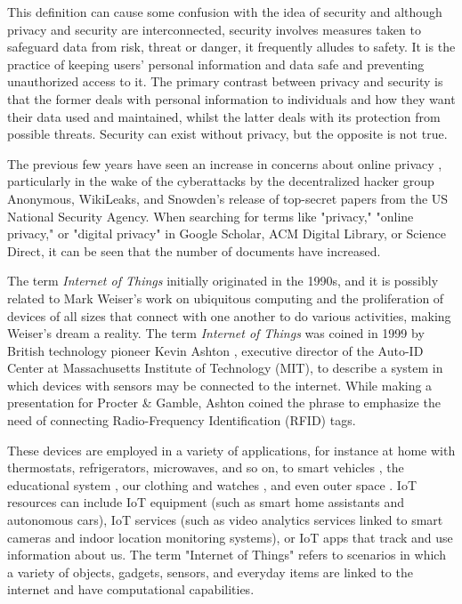 \documentclass[manuscript,natbib=false]{acmart}
\begin{document}
This definition can cause some confusion with the idea of security \cite{HIVDifference}
and although privacy and security are interconnected, security involves
measures taken to safeguard data from risk, threat or danger, it frequently
alludes to safety. It is the practice of keeping users' personal information
and data safe and preventing unauthorized access to it. The primary contrast
between privacy and security is that the former deals with personal information
to individuals and how they want their data used and maintained, whilst
the latter deals with its protection from possible threats. Security can
exist without privacy, but the opposite is not true.

The previous few years have seen an increase in concerns about online privacy \cite{emami2019exploring, park2022personal, zhang2022peer},
particularly in the wake of the cyberattacks by the decentralized hacker
group Anonymous, WikiLeaks, and Snowden's release of top-secret papers
from the US National Security Agency. When searching for terms like "privacy,"
"online privacy," or "digital privacy" in Google Scholar, ACM Digital Library,
or Science Direct, it can be seen that the number of documents have increased.

The term \textit{Internet of Things} initially originated in the 1990s, and it is
possibly related to Mark Weiser's work on ubiquitous computing \cite{weiser1991computer}
and the proliferation
of devices of all sizes that connect with one another to do various activities,
making Weiser's dream a reality. The term \textit{Internet of Things} was coined in
1999 by British technology pioneer Kevin Ashton \cite{KevinThat}, executive director of the
Auto-ID Center at Massachusetts Institute of Technology (MIT), to describe
a system in which devices with sensors may be connected to the internet.
While making a presentation for Procter \& Gamble, Ashton coined the phrase
to emphasize the need of connecting Radio-Frequency Identification (RFID) tags.

These devices are employed in a variety of applications, for instance at home \cite{marikyan2019systematic}
with thermostats, refrigerators, microwaves, and so on, to
smart vehicles \cite{arena2020overview}, the educational system \cite{al2020survey},
our clothing and watches \cite{niknejad2020comprehensive}, and even
outer space \cite{AkyildizInternet}. IoT resources can include IoT equipment (such as smart home
assistants and autonomous cars), IoT services (such as video analytics
services linked to smart cameras and indoor location monitoring systems),
or IoT apps that track and use information about us. The term "Internet of
Things" refers to scenarios in which a variety of objects, gadgets, sensors,
and everyday items are linked to the internet and have computational capabilities.
\end{document}
